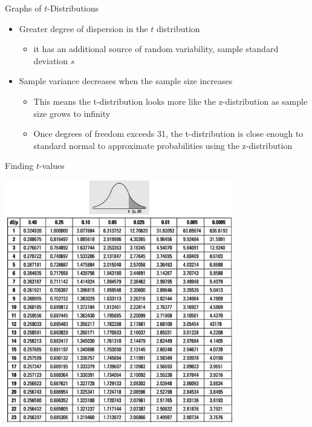 \documentclass{beamer}
\begin{document}
\begin{frame}{Graphs of $t$-Distributions}
	
	\begin{itemize}
		\item Greater degree of dispersion in the $t$ distribution
		      \begin{itemize}
		      	\item it has an additional source of random variability, sample standard deviation $s$
		      \end{itemize}
		\item Sample variance decreases when the sample size increases
		      \begin{itemize}
		      	\item This means the t-distribution looks more like the z-distribution as sample size grows to infinity
		      	\item Once degrees of freedom exceeds 31, the t-distribution is close enough to standard normal  to approximate probabilities using the z-distribution
		      \end{itemize}
	\end{itemize}
	
\end{frame}

\begin{frame}{Finding $t$-values}
	\begin{center}
		\includegraphics[width=0.75\textwidth]{t_table}
	\end{center}
\end{frame}
\end{document}
